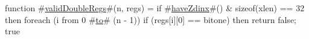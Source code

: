 function #\hyperref[sailRISCVzvalidDoubleRegs]{validDoubleRegs}#(n, regs) = {
  if #\hyperref[sailRISCVzhaveZdinx]{haveZdinx}#() & sizeof(xlen) == 32 then
    foreach (i from 0 #\hyperref[sailRISCVzto]{to}# (n - 1))
      if (regs[i][0] == bitone) then return false;
  true
}
